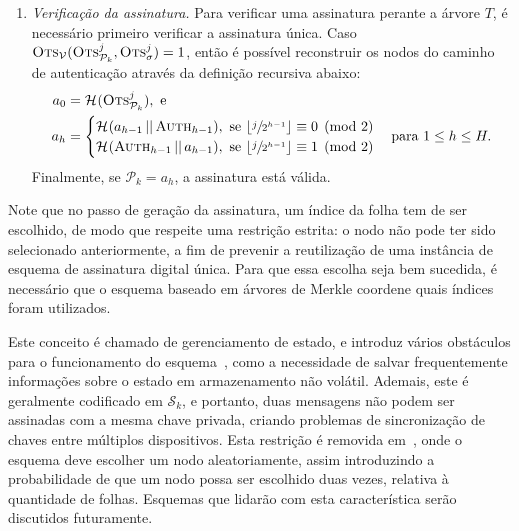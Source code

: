 \documentclass[12pt]{report}
\newcommand{\pk}{\mathcal{P}_k}
\newcommand{\sk}{\mathcal{S}_k}
\newcommand{\hash}[2][]{\mathcal{H}^{#1}(#2)}
\newcommand{\concat}{\, \vert \vert \,}
\begin{document}
\begin{enumerate}
  \item[] \emph{Verificação da assinatura.} Para verificar uma assinatura
      perante a árvore $T$, é necessário primeiro verificar a assinatura única.
        Caso $\textsc{Ots}_{\mathcal{V}}(\textsc{Ots}_{\pk{}}^{j},
        \textsc{Ots}_{\sigma}^{j}) = 1$, então é possível reconstruir os nodos
        do caminho de autenticação através da definição recursiva abaixo:
        \begin{equation}
          \begin{split}
            a_{0} &= \hash{\textsc{Ots}_{\pk{}}^{j}}, \text{ e } \\
            a_{h} &=
            \begin{cases}
              \hash{a_{h - 1} \concat \textsc{Auth}_{h - 1}}, \text{ se }
                \lfloor \sfrac{j}{2^{h - 1}} \rfloor \equiv 0 \pmod{2} \\
              \hash{\textsc{Auth}_{h - 1} \concat a_{h - 1}}, \text{ se }
                \lfloor \sfrac{j}{2^{h - 1}} \rfloor \equiv 1 \pmod{2} \\
            \end{cases} \text{para } 1 \leq h \leq H.
          \end{split}
        \end{equation}
        Finalmente, se $\pk{} = a_{h}$, a assinatura está válida.

\end{enumerate}

Note que no passo de geração da assinatura, um índice da folha tem de ser escolhido, de modo que respeite uma restrição estrita: o nodo não pode ter sido selecionado anteriormente, a fim de prevenir a reutilização de uma instância de esquema de assinatura digital única. Para que essa escolha seja bem sucedida, é necessário que o esquema baseado em árvores de Merkle coordene quais índices foram utilizados.

Este conceito é chamado de gerenciamento de estado, e introduz vários obstáculos para o funcionamento do esquema~\cite{McGrew2016}, como a necessidade de salvar frequentemente informações sobre o estado em armazenamento não volátil. Ademais, este é geralmente codificado em $\sk{}$, e portanto, duas mensagens não podem ser assinadas com a mesma chave privada, criando problemas de sincronização de chaves entre múltiplos dispositivos. Esta restrição é removida em~\cite[6.4.16]{Goldreich:2004:FCV:975541}, onde o esquema deve escolher um nodo aleatoriamente, assim introduzindo a probabilidade de que um nodo possa ser escolhido duas vezes, relativa à quantidade de folhas. Esquemas que lidarão com esta característica serão discutidos futuramente.
\end{document}
